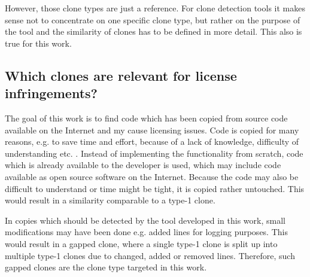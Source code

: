 However, those clone types are just a reference.
For clone detection tools it makes sense not to concentrate on one specific clone type, but rather on the purpose of the tool and the similarity of clones has to be defined in more detail.
This also is true for this work.
 
\subsection*{Which clones are relevant for license infringements?}
The goal of this work is to find code which has been copied from source code available on the Internet and my cause licensing issues.
Code is copied for many reasons, e.g. to save time and effort, because of a lack of knowledge, difficulty of understanding etc. \cite{roy2007survey}.
Instead of implementing the functionality from scratch, code which is already available to the developer is used, which may include code available as open source software on the Internet.
Because the code may also be difficult to understand or time might be tight, it is copied rather untouched.
This would result in a similarity comparable to a type-1 clone.

In copies which should be detected by the tool developed in this work, small modifications may have been done e.g. added lines for logging purposes.
This would result in a gapped clone, where a single type-1 clone is split up into multiple type-1 clones due to changed, added or removed lines.
Therefore, such gapped clones are the clone type targeted in this work.